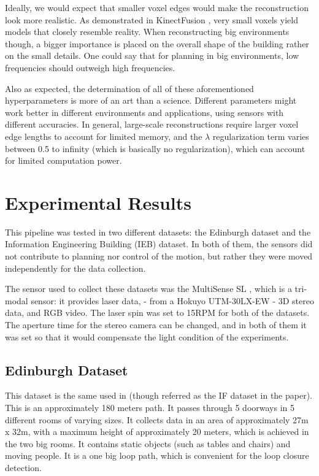 \documentclass[11pt]{article}
\begin{document}
Ideally, we would expect that smaller voxel edges would make the reconstruction look more realistic. As demonstrated in KinectFusion \cite{kinectfusion}, very small voxels yield models that closely resemble reality. When reconstructing big environments though, a bigger importance is placed on the overall shape of the building rather on the small details. One could say that for planning in big environments, low frequencies should outweigh high frequencies. 

Also as expected, the determination of all of these aforementioned hyperparameters is more of an art than a science. Different parameters might work better in different environments and applications, using sensors with different accuracies. In general, large-scale reconstructions require larger voxel edge lengths to account for limited memory, and the $\lambda$ regularization term varies between 0.5 to infinity (which is basically no regularization), which can account for limited computation power.
			
	\newpage
	\section{Experimental Results}
	\label{subs:experiments}

This pipeline was tested in two different datasets: the Edinburgh dataset and the Information Engineering Building (IEB) dataset. In both of them, the sensors did not contribute to planning nor control of the motion, but rather they were moved independently for the data collection.
	
The sensor used to collect these datasets was the MultiSense SL \cite{multisense}, which is a tri-modal sensor: it provides laser data, - from a Hokuyo UTM-30LX-EW \cite{HokuyoDataSheet}- 3D stereo data, and RGB video. The laser spin was set to 15RPM for both of the datasets. The aperture time for the stereo camera can be changed, and in both of them it was set so that it would compensate the light condition of the experiments. 
	
	\subsection{Edinburgh Dataset}

This dataset is the same used in \cite{AICPAlign} (though referred as the IF dataset in the paper). This is an approximately 180 meters path. It passes through 5 doorways in 5 different rooms of varying sizes. It collects data in an area of approximately 27m x 32m, with a maximum height of approximately 20 meters, which is achieved in the two big rooms. It contains static objects (such as tables and chairs) and moving people. It is a one big loop path, which is convenient for the loop closure detection.
	
\end{document}
